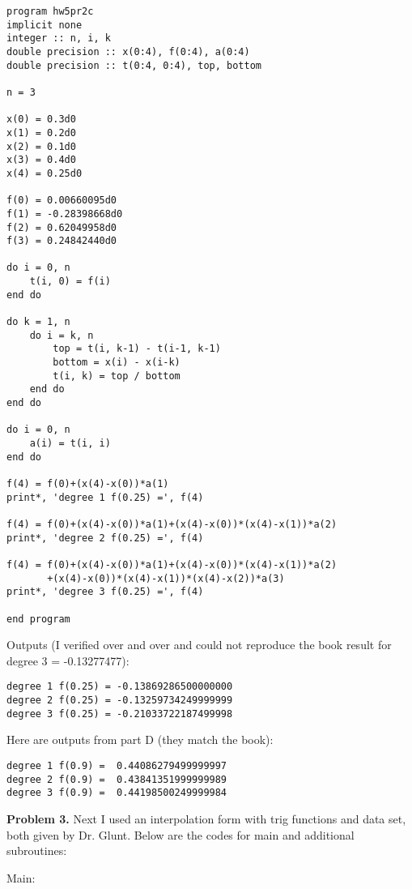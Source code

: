 \documentclass[12pt]{article}
\begin{document}
\begin{verbatim}
program hw5pr2c
implicit none
integer :: n, i, k
double precision :: x(0:4), f(0:4), a(0:4)
double precision :: t(0:4, 0:4), top, bottom

n = 3

x(0) = 0.3d0
x(1) = 0.2d0
x(2) = 0.1d0
x(3) = 0.4d0
x(4) = 0.25d0

f(0) = 0.00660095d0
f(1) = -0.28398668d0
f(2) = 0.62049958d0
f(3) = 0.24842440d0

do i = 0, n
	t(i, 0) = f(i)
end do

do k = 1, n
	do i = k, n 
		top = t(i, k-1) - t(i-1, k-1)
		bottom = x(i) - x(i-k)
		t(i, k) = top / bottom
	end do
end do

do i = 0, n
	a(i) = t(i, i)
end do

f(4) = f(0)+(x(4)-x(0))*a(1)
print*, 'degree 1 f(0.25) =', f(4)

f(4) = f(0)+(x(4)-x(0))*a(1)+(x(4)-x(0))*(x(4)-x(1))*a(2)
print*, 'degree 2 f(0.25) =', f(4)

f(4) = f(0)+(x(4)-x(0))*a(1)+(x(4)-x(0))*(x(4)-x(1))*a(2)
       +(x(4)-x(0))*(x(4)-x(1))*(x(4)-x(2))*a(3)
print*, 'degree 3 f(0.25) =', f(4)

end program
\end{verbatim}

Outputs (I verified over and over and could not reproduce the book result for degree 3 = -0.13277477):

\begin{verbatim}
degree 1 f(0.25) = -0.13869286500000000
degree 2 f(0.25) = -0.13259734249999999
degree 3 f(0.25) = -0.21033722187499998
\end{verbatim}

Here are outputs from part D (they match the book):

\begin{verbatim}
degree 1 f(0.9) =  0.44086279499999997
degree 2 f(0.9) =  0.43841351999999989
degree 3 f(0.9) =  0.44198500249999984
\end{verbatim}

\bigskip

\textbf{Problem 3.} Next I used an interpolation form with trig functions and data set, both given by Dr. Glunt. Below are the codes for main and additional subroutines:

Main:
\end{document}
